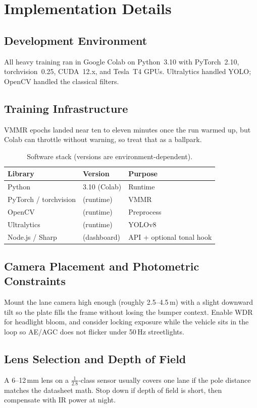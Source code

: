 \documentclass[10pt, conference]{IEEEtran}
\begin{document}
\section{Implementation Details}
\label{sec:impl}
\subsection{Development Environment}
All heavy training ran in Google Colab on Python~3.10 with PyTorch~2.10, torchvision~0.25, CUDA~12.x, and Tesla~T4 GPUs. Ultralytics handled YOLO; OpenCV handled the classical filters.

\subsection{Training Infrastructure}
VMMR epochs landed near ten to eleven minutes once the run warmed up, but Colab can throttle without warning, so treat that as a ballpark.

\begin{table}[!htbp]
\centering
\caption{Software stack (versions are environment-dependent).}
\begin{tabular}{@{}lll@{}}
\toprule
Library & Version & Purpose \\
\midrule
Python & 3.10 (Colab) & Runtime \\
PyTorch / torchvision & (runtime) & VMMR \\
OpenCV & (runtime) & Preprocess \\
Ultralytics & (runtime) & YOLOv8 \\
Node.js / Sharp & (dashboard) & API + optional tonal hook \\
\bottomrule
\end{tabular}
\end{table}

\subsection{Camera Placement and Photometric Constraints}
Mount the lane camera high enough (roughly 2.5--4.5\,m) with a slight downward tilt so the plate fills the frame without losing the bumper context. Enable WDR for headlight bloom, and consider locking exposure while the vehicle sits in the loop so AE/AGC does not flicker under 50\,Hz streetlights.

\subsection{Lens Selection and Depth of Field}
A 6--12\,mm lens on a $\frac{1}{2.8}$-class sensor usually covers one lane if the pole distance matches the datasheet math. Stop down if depth of field is short, then compensate with IR power at night.
\end{document}
